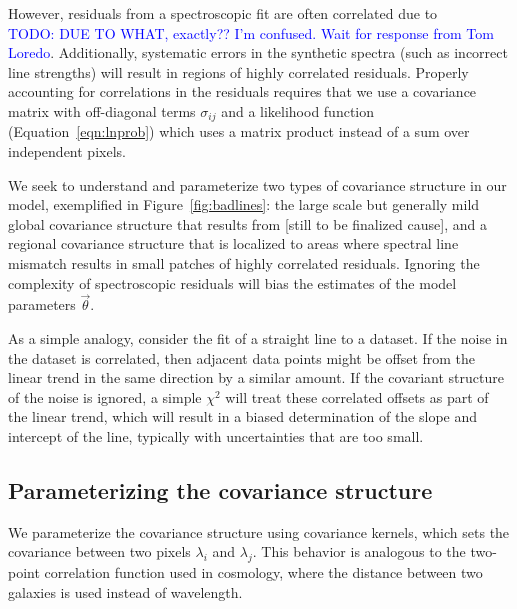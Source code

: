 \documentclass[preprint]{aastex} %
\newcommand{\vt}{\vec{\theta}}
\newcommand{\todo}[1]{ \textcolor{Blue}{\\TODO: #1}}
\begin{document}
However, residuals from a spectroscopic fit are often correlated due to \todo{DUE TO WHAT, exactly?? I'm confused. Wait for response from Tom Loredo}. Additionally, systematic errors in the synthetic spectra (such as incorrect line strengths) will result in regions of highly correlated residuals. Properly accounting for correlations in the residuals requires that we use a covariance matrix with off-diagonal terms $\sigma_{ij}$ and a likelihood function (Equation~\ref{eqn:lnprob}) which uses a matrix product instead of a sum over independent pixels.

We seek to understand and parameterize two types of covariance structure in our model, exemplified in Figure~\ref{fig:badlines}: the large scale but generally mild global covariance structure that results from [still to be finalized cause], and a regional covariance structure that is localized to areas where spectral line mismatch results in small patches of highly correlated residuals. Ignoring the complexity of spectroscopic residuals will bias the estimates of the model parameters $\vt$. 

As a simple analogy, consider the fit of a straight line to a dataset. If the noise in the dataset is correlated, then adjacent data points might be offset from the linear trend in the same direction by a similar amount. If the covariant structure of the noise is ignored, a simple $\chi^2$ will treat these correlated offsets as part of the linear trend, which will result in a biased determination of the slope and intercept of the line, typically with uncertainties that are too small.

\subsection{Parameterizing the covariance structure}
We parameterize the covariance structure using covariance kernels, which sets the covariance between two pixels $\lambda_i$ and $\lambda_j$. This behavior is analogous to the two-point correlation function used in cosmology, where the distance between two galaxies is used instead of wavelength.
\end{document}
